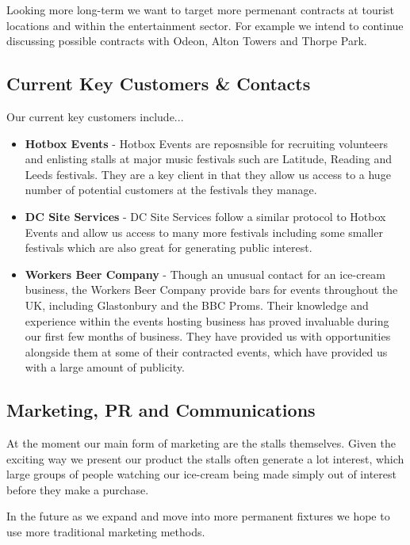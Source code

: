 \documentclass{article}
\begin{document}
  Looking more long-term we want to target more permenant contracts at tourist locations and within the entertainment sector. For example we intend to continue discussing possible contracts with Odeon, Alton Towers and Thorpe Park.

  \subsection{Current Key Customers \& Contacts}

  Our current key customers include...
  \begin{itemize}

  \item {\bf Hotbox Events} - Hotbox Events are reposnsible for recruiting volunteers and enlisting stalls at major music festivals such are Latitude, Reading and Leeds festivals. They are a key client in that they allow us access to a huge number of potential customers at the festivals they manage.

  \item {\bf DC Site Services} - DC Site Services follow a similar protocol to Hotbox Events and allow us access to many more festivals including some smaller festivals which are also great for generating public interest.

  \item {\bf Workers Beer Company} - Though an unusual contact for an ice-cream business, the Workers Beer Company provide bars for events throughout the UK, including Glastonbury and the BBC Proms. Their knowledge and experience within the events hosting business has proved invaluable during our first few months of business. They have provided us with opportunities alongside them at some of their contracted events, which have provided us with a large amount of publicity.

  \end{itemize}

  \subsection{Marketing, PR and Communications}
  At the moment our main form of marketing are the stalls themselves. Given the exciting way we present our product the stalls often generate a lot interest, which large groups of people watching our ice-cream being made simply out of interest before they make a purchase.

  In the future as we expand and move into more permanent fixtures we hope to use more traditional marketing methods.
\end{document}
